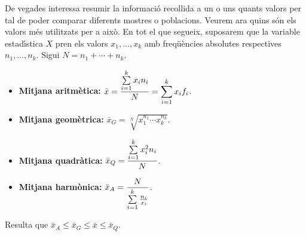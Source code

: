 De vegades interessa resumir la informaci\'o recollida a un o uns quants valors
per tal de poder comparar diferents mostres o poblacions. 
Veurem ara quins s\'on els valors m\'es utilitzats per a aix\`o. 
En tot el que segueix, suposarem que la variable estad\'{\i}stica $X$ 
pren els valors $x_1, \ldots , x_k$ amb freq\"u\`encies
absolutes respectives $n_1, \ldots , n_k$. 
Sigui $N = n_1 + \cdots + n_k$.

\begin{itemize}

\item {\bf Mitjana aritm\`etica:} 
$\displaystyle \bar{x} = {\sum\limits_{i=1}^k x_i n_i \over N} = 
\sum_{i=1}^k x_i f_i$.

\item {\bf Mitjana geom\`etrica:} 
$\displaystyle \bar{x}_G = \sqrt[N]{x_1^{n_1}
\cdots x_k^{n_k}}$.

\item {\bf Mitjana quadr\`atica:} 
$\displaystyle \bar{x}_Q = {\sum\limits_{i=1}^k
x_i^2 n_i \over N}$.

\item {\bf Mitjana harm\`onica:} 
$\displaystyle \bar{x}_A = {N \over\sum\limits_{i=1}^k {n_i \over x_i}}$.

\end{itemize}

Resulta que $\bar{x}_A \leq \bar{x}_G \leq \bar{x} \leq \bar{x}_Q$.

